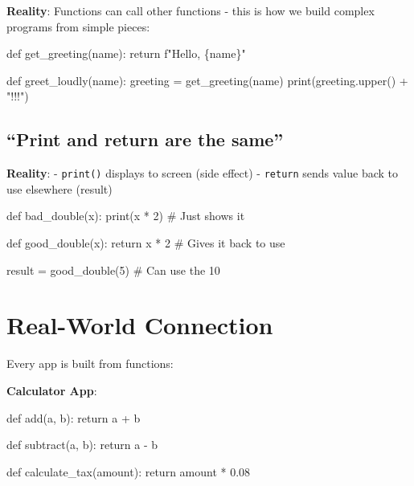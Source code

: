 \documentclass[
  letterpaper,
  DIV=11,
  numbers=noendperiod,
  oneside]{scrreprt}
\newenvironment{Shaded}{}{}
\newcommand{\BuiltInTok}[1]{\textcolor[rgb]{0.84,0.23,0.29}{#1}}
\newcommand{\CommentTok}[1]{\textcolor[rgb]{0.42,0.45,0.49}{#1}}
\newcommand{\ControlFlowTok}[1]{\textcolor[rgb]{0.84,0.23,0.29}{#1}}
\newcommand{\DecValTok}[1]{\textcolor[rgb]{0.00,0.36,0.77}{#1}}
\newcommand{\FloatTok}[1]{\textcolor[rgb]{0.00,0.36,0.77}{#1}}
\newcommand{\KeywordTok}[1]{\textcolor[rgb]{0.84,0.23,0.29}{#1}}
\newcommand{\NormalTok}[1]{\textcolor[rgb]{0.14,0.16,0.18}{#1}}
\newcommand{\OperatorTok}[1]{\textcolor[rgb]{0.14,0.16,0.18}{#1}}
\newcommand{\SpecialCharTok}[1]{\textcolor[rgb]{0.00,0.36,0.77}{#1}}
\newcommand{\SpecialStringTok}[1]{\textcolor[rgb]{0.01,0.18,0.38}{#1}}
\newcommand{\StringTok}[1]{\textcolor[rgb]{0.01,0.18,0.38}{#1}}
\begin{document}
\textbf{Reality}: Functions can call other functions - this is how we
build complex programs from simple pieces:

\begin{Shaded}
\begin{Highlighting}[]
\KeywordTok{def}\NormalTok{ get\_greeting(name):}
    \ControlFlowTok{return} \SpecialStringTok{f"Hello, }\SpecialCharTok{\{}\NormalTok{name}\SpecialCharTok{\}}\SpecialStringTok{"}

\KeywordTok{def}\NormalTok{ greet\_loudly(name):}
\NormalTok{    greeting }\OperatorTok{=}\NormalTok{ get\_greeting(name)}
    \BuiltInTok{print}\NormalTok{(greeting.upper() }\OperatorTok{+} \StringTok{"!!!"}\NormalTok{)}
\end{Highlighting}
\end{Shaded}

\subsection{``Print and return are the
same''}\label{print-and-return-are-the-same}

\textbf{Reality}: - \texttt{print()} displays to screen (side effect) -
\texttt{return} sends value back to use elsewhere (result)

\begin{Shaded}
\begin{Highlighting}[]
\KeywordTok{def}\NormalTok{ bad\_double(x):}
    \BuiltInTok{print}\NormalTok{(x }\OperatorTok{*} \DecValTok{2}\NormalTok{)  }\CommentTok{\# Just shows it}

\KeywordTok{def}\NormalTok{ good\_double(x):}
    \ControlFlowTok{return}\NormalTok{ x }\OperatorTok{*} \DecValTok{2}  \CommentTok{\# Gives it back to use}

\NormalTok{result }\OperatorTok{=}\NormalTok{ good\_double(}\DecValTok{5}\NormalTok{)  }\CommentTok{\# Can use the 10}
\end{Highlighting}
\end{Shaded}

\section{Real-World Connection}\label{real-world-connection-5}

Every app is built from functions:

\textbf{Calculator App}:

\begin{Shaded}
\begin{Highlighting}[]
\KeywordTok{def}\NormalTok{ add(a, b):}
    \ControlFlowTok{return}\NormalTok{ a }\OperatorTok{+}\NormalTok{ b}

\KeywordTok{def}\NormalTok{ subtract(a, b):}
    \ControlFlowTok{return}\NormalTok{ a }\OperatorTok{{-}}\NormalTok{ b}

\KeywordTok{def}\NormalTok{ calculate\_tax(amount):}
    \ControlFlowTok{return}\NormalTok{ amount }\OperatorTok{*} \FloatTok{0.08}
\end{Highlighting}
\end{Shaded}
\end{document}
